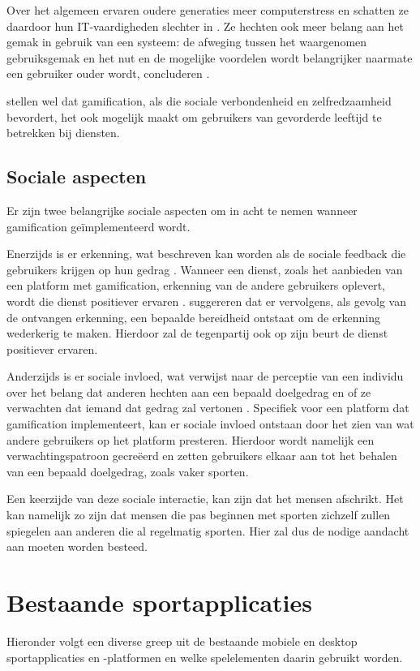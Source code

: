 Over het algemeen ervaren oudere generaties meer computerstress en schatten ze daardoor hun IT-vaardigheden slechter in \autocite{Chung2010}. Ze hechten ook meer belang aan het gemak in gebruik van een systeem: de afweging tussen het waargenomen gebruiksgemak en het nut en de mogelijke voordelen wordt belangrijker naarmate een gebruiker ouder wordt, concluderen \textcite{Melenhorst2001}.

\textcite{Arning2007, Czaja2006} stellen wel dat gamification, als die sociale verbondenheid en zelfredzaamheid bevordert, het ook mogelijk maakt om gebruikers van gevorderde leeftijd te betrekken bij diensten.

\subsection{Sociale aspecten}
Er zijn twee belangrijke sociale aspecten om in acht te nemen wanneer gamification geïmplementeerd wordt.

Enerzijds is er erkenning, wat beschreven kan worden als de sociale feedback die gebruikers krijgen op hun gedrag \autocite{Cheung2011}.
Wanneer een dienst, zoals het aanbieden van een platform met gamification, erkenning van de andere gebruikers oplevert, wordt die dienst positiever ervaren \autocite{Preece2001}.
\textcite{Hamari2013} suggereren dat er vervolgens, als gevolg van de ontvangen erkenning, een bepaalde bereidheid ontstaat om de erkenning wederkerig te maken. Hierdoor zal de tegenpartij ook op zijn beurt de dienst positiever ervaren.

Anderzijds is er sociale invloed, wat verwijst naar de perceptie van een individu over het belang dat anderen hechten aan een bepaald doelgedrag en of ze verwachten dat iemand dat gedrag zal vertonen \autocite{Ajzen1991}. Specifiek voor een platform dat gamification implementeert, kan er sociale invloed ontstaan door het zien van wat andere gebruikers op het platform presteren. Hierdoor wordt namelijk een verwachtingspatroon gecreëerd en zetten gebruikers elkaar aan tot het behalen van een bepaald doelgedrag, zoals vaker sporten.

Een keerzijde van deze sociale interactie, kan zijn dat het mensen afschrikt. Het kan namelijk zo zijn dat mensen die pas beginnen met sporten zichzelf zullen spiegelen aan anderen die al regelmatig sporten. Hier zal dus de nodige aandacht aan moeten worden besteed.

\section{Bestaande sportapplicaties}
Hieronder volgt een diverse greep uit de bestaande mobiele en desktop sportapplicaties en -platformen en welke spelelementen daarin gebruikt worden.

